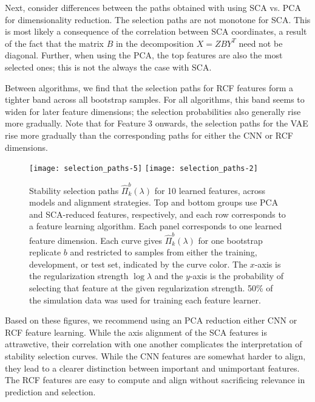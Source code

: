 Next, consider differences between the paths obtained with using SCA vs. PCA for
dimensionality reduction. The selection paths are not monotone for SCA. This is
most likely a consequence of the correlation between SCA coordinates, a result
of the fact that the matrix $B$ in the decomposition $X = Z B Y^{T}$ need not be
diagonal. Further, when using the PCA, the top features are also the most
selected ones; this is not the always the case with SCA.

Between algorithms, we find that the selection paths for RCF features form a
tighter band across all bootstrap samples. For all algorithms, this band seems
to widen for later feature dimensions; the selection probabilities also
generally rise more gradually. Note that for Feature 3 onwards, the selection
paths for the VAE rise more gradually than the corresponding paths for either
the CNN or RCF dimensions.

\begin{figure}
  \centering
  \texttt{[image: selection\_paths-5]}
  \texttt{[image: selection\_paths-2]}
  \caption{Stability selection paths $\hat{\Pi}_{k}^{b}\left(\lambda\right)$ for
    10 learned features, across models and alignment strategies. Top and bottom
    groups use PCA and SCA-reduced features, respectively, and each row
    corresponds to a feature learning algorithm. Each panel corresponds to one
    learned feature dimension. Each curve gives
    $\hat{\Pi}_{k}^{b}\left(\lambda\right)$ for one bootstrap replicate $b$ and
    restricted to samples from either the training, development, or test set,
    indicated by the curve color. The $x$-axis is the regularization strength
    $\log \lambda$ and the $y$-axis is the probability of selecting that feature
    at the given regularization strength. 50\% of the simulation data was used
    for training each feature learner.}
  \label{fig:selection_paths50}
\end{figure}

Based on these figures, we recommend using an PCA reduction either CNN or RCF
feature learning. While the axis alignment of the SCA features is attrawctive,
their correlation with one another complicates the interpretation of stability
selection curves. While the CNN features are somewhat harder to align, they lead
to a clearer distinction between important and unimportant features. The RCF
features are easy to compute and align without sacrificing relevance in
prediction and selection.
